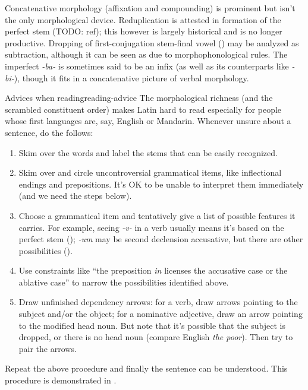 \documentclass[a4paper, oneside, 12pt]{report}
\newcommand{\form}[1]{\emph{#1}}
\begin{document}
Concatenative morphology (affixation and compounding) 
is prominent but isn't the only morphological device.
Reduplication is attested in 
formation of the perfect stem (TODO: ref);
this however is largely historical 
and is no longer productive.
Dropping of first-conjugation stem-final vowel ()
may be analyzed as subtraction,
although it can be seen as due to morphophonological rules.
The imperfect \form{-ba-} is sometimes said to be an infix 
(as well as its counterparts like \form{-bi-}),
though it fits in a concatenative picture of verbal morphology.

\begin{infobox}{Advices when reading}{reading-advice}
    The morphological richness (and the scrambled constituent order)
    makes Latin hard to read 
    especially for people whose first languages are, say, 
    English or Mandarin. 
    Whenever unsure about a sentence, do the follows: 
    \begin{enumerate}
        \item Skim over the words and label the stems that can be easily recognized.  
        \item Skim over and circle uncontroversial grammatical items,  
            like inflectional endings and prepositions. 
            It's OK to be unable to interpret them immediately (and we need the steps below).
        \item Choose a grammatical item and tentatively give a list of possible features it carries.  
            For example, seeing \form{-v-} in a verb usually means
            it's based on the perfect stem
            ();
            \form{-um} may be second declension accusative,
            but there are other possibilities
            (). 
        \item Use constraints like 
            ``the preposition \form{in} licenses the accusative case or the ablative case'' 
            to narrow the possibilities identified above.
        \item Draw unfinished dependency arrows:
            for a verb, draw arrows pointing to the subject and/or the object; 
            for a nominative adjective, draw an arrow pointing to the modified head noun. 
            But note that it's possible that the subject is dropped, 
            or there is no head noun (compare English \form{the poor}).
            Then try to pair the arrows.
    \end{enumerate}
    Repeat the above procedure and finally the sentence can be understood. 
    This procedure is demonstrated in .
\end{infobox}
\end{document}
